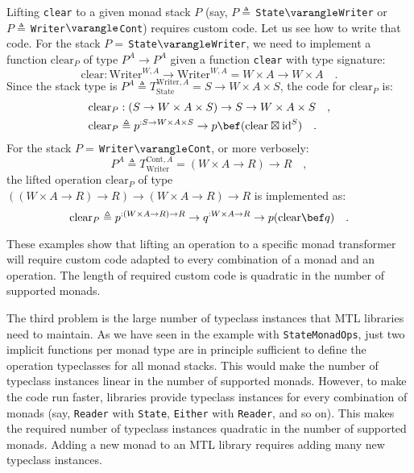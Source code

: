 Lifting \lstinline!clear! to a given monad stack $P$ (say, $P\triangleq\,$\lstinline!State!$\varangle$\lstinline!Writer!
or $P\triangleq\,$\lstinline!Writer!$\varangle$\lstinline!Cont!)
requires custom code. Let us see how to write that code. For the stack
$P=\,$\lstinline!State!$\varangle$\lstinline!Writer!, we need
to implement a function $\text{clear}_{P}$ of type $P^{A}\rightarrow P^{A}$
given a function \lstinline!clear! with type signature:
\[
\text{clear}:\text{Writer}^{W,A}\rightarrow\text{Writer}^{W,A}=W\times A\rightarrow W\times A\quad.
\]
Since the stack type is $P^{A}\triangleq T_{\text{State}}^{\text{Writer},A}=S\rightarrow W\times A\times S$,
the code for $\text{clear}_{P}$ is:
\begin{align*}
 & \text{clear}_{P}:\left(S\rightarrow W\times A\times S\right)\rightarrow S\rightarrow W\times A\times S\quad,\\
 & \text{clear}_{P}\triangleq p^{:S\rightarrow W\times A\times S}\rightarrow p\bef(\text{clear}\boxtimes\text{id}^{S})\quad.
\end{align*}
For the stack $P=\,$\lstinline!Writer!$\varangle$\lstinline!Cont!,
or more verbosely:
\[
P^{A}\triangleq T_{\text{Writer}}^{\text{Cont},A}=(W\times A\rightarrow R)\rightarrow R\quad,
\]
the lifted operation $\text{clear}_{P}$ of type $\left((W\times A\rightarrow R)\rightarrow R\right)\rightarrow(W\times A\rightarrow R)\rightarrow R$
is implemented as:
\[
\text{clear}_{P}\triangleq p^{:(W\times A\rightarrow R)\rightarrow R}\rightarrow q^{:W\times A\rightarrow R}\rightarrow p(\text{clear}\bef q)\quad.
\]

These examples show that lifting an operation to a specific monad
transformer will require custom code adapted to every combination
of a monad and an operation. The length of required custom code is
quadratic in the number of supported monads.

The third problem is the large number of typeclass instances that
MTL libraries need to maintain. As we have seen in the example with
\lstinline!StateMonadOps!, just two implicit functions per monad
type are in principle sufficient to define the operation typeclasses
for all monad stacks. This would make the number of typeclass instances
linear in the number of supported monads. However, to make the code
run faster, libraries provide typeclass instances for every combination
of monads (say, \lstinline!Reader! with \lstinline!State!, \lstinline!Either!
with \lstinline!Reader!, and so on). This makes the required number
of typeclass instances quadratic in the number of supported monads.
Adding a new monad to an MTL library requires adding many new typeclass
instances.

